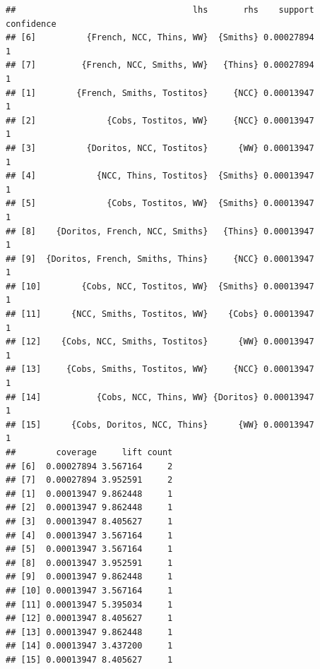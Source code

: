 \documentclass[
]{article}
\newenvironment{Shaded}{\begin{snugshade}}{\end{snugshade}}
\newcommand{\AttributeTok}[1]{\textcolor[rgb]{0.13,0.29,0.53}{#1}}
\newcommand{\CommentTok}[1]{\textcolor[rgb]{0.56,0.35,0.01}{\textit{#1}}}
\newcommand{\FloatTok}[1]{\textcolor[rgb]{0.00,0.00,0.81}{#1}}
\newcommand{\FunctionTok}[1]{\textcolor[rgb]{0.13,0.29,0.53}{\textbf{#1}}}
\newcommand{\NormalTok}[1]{#1}
\newcommand{\OtherTok}[1]{\textcolor[rgb]{0.56,0.35,0.01}{#1}}
\newcommand{\SpecialCharTok}[1]{\textcolor[rgb]{0.81,0.36,0.00}{\textbf{#1}}}
\newcommand{\StringTok}[1]{\textcolor[rgb]{0.31,0.60,0.02}{#1}}
\begin{document}
\begin{verbatim}
##                                   lhs       rhs    support confidence
## [6]          {French, NCC, Thins, WW}  {Smiths} 0.00027894          1
## [7]         {French, NCC, Smiths, WW}   {Thins} 0.00027894          1
## [1]        {French, Smiths, Tostitos}     {NCC} 0.00013947          1
## [2]              {Cobs, Tostitos, WW}     {NCC} 0.00013947          1
## [3]          {Doritos, NCC, Tostitos}      {WW} 0.00013947          1
## [4]            {NCC, Thins, Tostitos}  {Smiths} 0.00013947          1
## [5]              {Cobs, Tostitos, WW}  {Smiths} 0.00013947          1
## [8]    {Doritos, French, NCC, Smiths}   {Thins} 0.00013947          1
## [9]  {Doritos, French, Smiths, Thins}     {NCC} 0.00013947          1
## [10]        {Cobs, NCC, Tostitos, WW}  {Smiths} 0.00013947          1
## [11]      {NCC, Smiths, Tostitos, WW}    {Cobs} 0.00013947          1
## [12]    {Cobs, NCC, Smiths, Tostitos}      {WW} 0.00013947          1
## [13]     {Cobs, Smiths, Tostitos, WW}     {NCC} 0.00013947          1
## [14]           {Cobs, NCC, Thins, WW} {Doritos} 0.00013947          1
## [15]      {Cobs, Doritos, NCC, Thins}      {WW} 0.00013947          1
##        coverage     lift count
## [6]  0.00027894 3.567164     2
## [7]  0.00027894 3.952591     2
## [1]  0.00013947 9.862448     1
## [2]  0.00013947 9.862448     1
## [3]  0.00013947 8.405627     1
## [4]  0.00013947 3.567164     1
## [5]  0.00013947 3.567164     1
## [8]  0.00013947 3.952591     1
## [9]  0.00013947 9.862448     1
## [10] 0.00013947 3.567164     1
## [11] 0.00013947 5.395034     1
## [12] 0.00013947 8.405627     1
## [13] 0.00013947 9.862448     1
## [14] 0.00013947 3.437200     1
## [15] 0.00013947 8.405627     1
\end{verbatim}

\begin{Shaded}
\end{Shaded}
\end{document}
